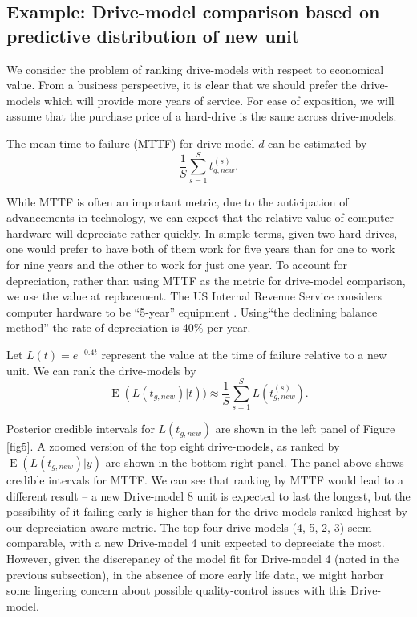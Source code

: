 \documentclass[12pt]{article}
\newcommand{\op}{\operatorname}
\begin{document}
\subsection{Example: Drive-model comparison based on predictive distribution of new unit}

We consider the problem of ranking drive-models with respect to economical value. From a
business perspective, it is clear
that we should prefer the drive-models which will provide more years
of service. For ease of exposition, we will assume that the purchase
price of a hard-drive is the same across drive-models.

The mean time-to-failure (MTTF) for drive-model $d$ can be estimated by
$$\frac{1}{S} \sum_{s=1}^{S} t_{g,new}^{(s)}.$$

While MTTF is often an important metric, due to the
anticipation of advancements in technology, we can expect that the
relative value of computer hardware will depreciate rather quickly. In simple terms, given two hard drives, one would prefer to have both of them work for five years than for one to work for nine years and the other to work for just one year. To account
for depreciation, rather than using MTTF as the metric for drive-model comparison, we use the value at replacement. The US Internal Revenue Service considers
computer hardware to be ``5-year'' equipment \citep{f4562}. Using``the declining
balance method'' the rate of depreciation is 40\% per year.

Let $L(t) = e^{-0.4t}$ represent the value at the time of failure
relative to a new unit. We can rank the drive-models by 
$$\op{E}(L(t_{g,new})|t))\approx \frac{1}{S} \sum_{s=1}^{S} L(t_{g,new}^{(s)}).$$

Posterior credible intervals for $L(t_{g,new})$ are shown in the left panel of Figure \ref{fig5}. A zoomed version of the top eight drive-models, as ranked by $\op{E}(L(t_{g,new})|y)$ are shown in the bottom right panel. The panel above shows credible intervals for MTTF. We can see that ranking by MTTF would lead to a different result -- a new Drive-model 8 unit is expected to last the longest, but the possibility of it failing early is higher than for the drive-models ranked highest by our depreciation-aware metric. The top four drive-models (4, 5, 2, 3) seem comparable, with a new Drive-model 4 unit expected to depreciate the most. However, given the discrepancy of the model fit for Drive-model 4 (noted in the previous subsection), in the absence of more early life data, we might harbor some lingering concern about possible quality-control issues with this Drive-model.
\end{document}
